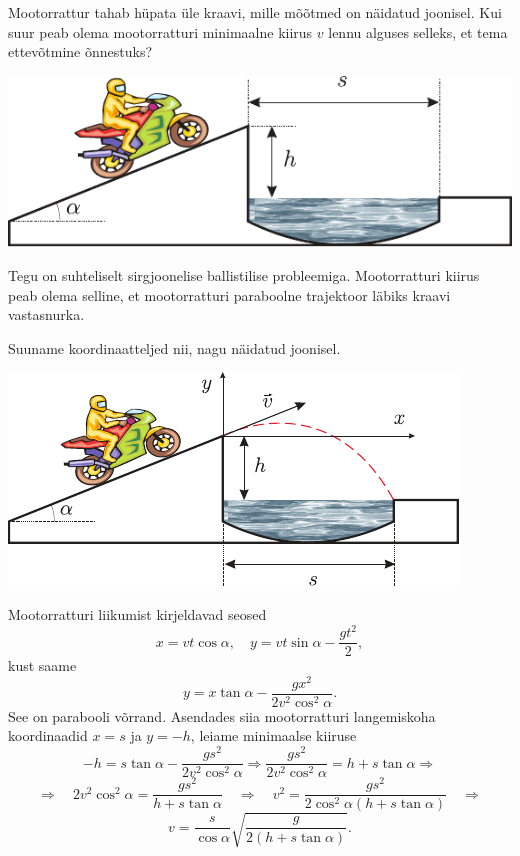 
Mootorrattur tahab hüpata üle kraavi, mille mõõtmed on näidatud joonisel. Kui suur peab olema mootorratturi minimaalne kiirus $v$ lennu alguses selleks, et tema ettevõtmine õnnestuks?

\begin{center}
	\includegraphics[width=0.8\linewidth]{2007-lahg-05-yl}
\end{center}

\hint
Tegu on suhteliselt sirgjoonelise ballistilise probleemiga. Mootorratturi kiirus peab olema selline, et mootorratturi paraboolne trajektoor läbiks kraavi vastasnurka.

\solu
Suuname koordinaatteljed nii, nagu näidatud joonisel.

\begin{center}
	\includegraphics[width=0.8\linewidth]{2007-lahg-05-lah}
\end{center}

Mootorratturi liikumist kirjeldavad seosed
\[
x=v t \cos \alpha, \quad y=v t \sin \alpha-\frac{g t^{2}}{2},
\]
kust saame
\[
y=x \tan \alpha-\frac{g x^{2}}{2 v^{2} \cos ^{2} \alpha}.
\]
See on parabooli võrrand. Asendades siia mootorratturi langemiskoha koordinaadid $x = s$ ja $y = -h$, leiame minimaalse kiiruse
\[
-h=s \tan \alpha-\frac{g s^{2}}{2 v^{2} \cos ^{2} \alpha} \Rightarrow \frac{g s^{2}}{2 v^{2} \cos ^{2} \alpha}=h+s \tan \alpha \Rightarrow
\]
\[
\Rightarrow \quad 2 v^{2} \cos ^{2} \alpha=\frac{g s^{2}}{h+s \tan \alpha} \quad \Rightarrow \quad v^{2}=\frac{g s^{2}}{2 \cos ^{2} \alpha(h+s \tan \alpha)} \quad \Rightarrow
\]
\[
v=\frac{s}{\cos \alpha} \sqrt{\frac{g}{2(h+s \tan \alpha)}}.
\]
\probend
